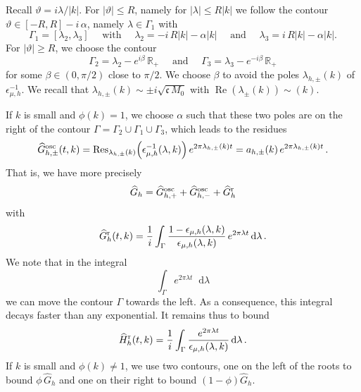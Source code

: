 \documentclass[a4paper,12pt]{amsart} %
\theoremstyle{plain}
\theoremstyle{definition}
\newcommand		{\RR}		{\mathbb R}			%
\newcommand		{\R}		{\RR}
\newcommand		{\lt}			{\left}				%
\newcommand		{\rt}			{\right}			%
\renewcommand	{\(}			{\lt(}
\renewcommand	{\)}			{\rt)}
\newcommand		{\n}[1]			{\lt\lvert{#1}\rt\rvert}	%
\renewcommand		{\d}		{\mathop{}\!\mathrm{d}}		%
\DeclareMathOperator{\re}		{Re}				%
\renewcommand	{\Re}[1]		{\re\!\( #1 \)}		%
\newcommand	{\h}			{h}
\newcommand		{\CK}			{\mathfrak{c}}	%
\newcommand		{\hatG}			{\widehat{G}}
\newcommand		{\hatGr}		{\hatG^{\textnormal{r}}}
\newcommand		{\hatGosc}		{\hatG^{\textnormal{osc}}}
\begin{document}
	Recall $\vartheta = i\lambda/|k|$. For $\n{\vartheta} \le R$, namely for $\n{\lambda} \le R \n{k}$ we follow the contour $\vartheta \in \lt[-R,R\rt] - i\, \alpha$, namely $\lambda \in \Gamma_1$ with
	\begin{equation*}
		\Gamma_1 = [\lambda_2,\lambda_3] \quad \text{ with } \quad\lambda_2 = - i \,R \n{k} - \alpha \n{k} \quad \text{ and } \quad \lambda_3 = i \,R \n{k} - \alpha \n{k} .
	\end{equation*}
	For $\n{\vartheta} \geq R$, we choose the contour
	\begin{equation*}
		\Gamma_2 = \lambda_2 - e^{i \beta} \,\R_+ \quad \text{ and } \quad \Gamma_3 = \lambda_3 - e^{- i \beta}\, \R_+
	\end{equation*}
	for some $\beta \in (0,\pi/2)$ close to $\pi / 2$. We choose $\beta$ to avoid the poles $ \lambda_{\h,\pm}(k)$ of $\epsilon_{\mu,\h}^{-1}$. We recall that $\lambda_{\h,\pm}(k) \sim \pm i\sqrt{\CK\,M_0}$ with $\Re{\lambda_\pm(k)} \sim {}(k)$. 
	
	If $k$ is small and $\phi(k) = 1$, we choose $\alpha$ such that these two poles are on the right of the contour $\Gamma = \Gamma_2 \cup \Gamma_1 \cup \Gamma_3$, which leads to the residues
	\begin{equation*}
		\hatGosc_{\h,\pm}(t,k) = \mathrm{Res}_{\lambda_{\h,\pm}(k)}\!\lt( \epsilon_{\mu,\h}^{-1}(\lambda,k)\rt) e^{2\pi\lambda_{\h,\pm}(k) t}
		= a_{\h,\pm}(k)\, e^{2\pi\lambda_{\h,\pm}(k) t} \, . 
	\end{equation*}%
	That is, we have more precisely
	\begin{equation}\label{eq:hatG_expansion}
		\hatG_\h = \hatGosc_{\h,+} + \hatGosc_{\h,-} + \hatGr_\h
	\end{equation}
	with
	\begin{equation}\label{eq:def_hatGr}
		\hatGr_\h(t,k) = \frac{1}{i} \int_\Gamma \frac{1-\epsilon_{\mu,\h}(\lambda,k)}{\epsilon_{\mu,\h}(\lambda,k)} 
		\, e^{2\pi\lambda t} \d\lambda \, .
	\end{equation}
	We note that in the integral
	\begin{equation*}
		\int_\Gamma e^{2 \pi \lambda t} \d\lambda
	\end{equation*}
	we can move the contour $\Gamma$ towards the left. As a consequence, this integral decays faster than any exponential. It remains thus to bound
	\begin{equation*}
		\widehat{H}_\h^\textnormal{r}(t,k) = \frac{1}{i} \int_\Gamma \frac{e^{2\pi\lambda t}}{\epsilon_{\mu,\h}(\lambda,k)} \d\lambda \, .
	\end{equation*}
	If $k$ is small and $\phi(k) \ne 1$, we use two contours, one on the left of the roots to bound $\phi \, \hatG_\h$ 
	and one on their right to bound $\lt(1 - \phi\rt) \hatG_\h$.
	
\end{document}
